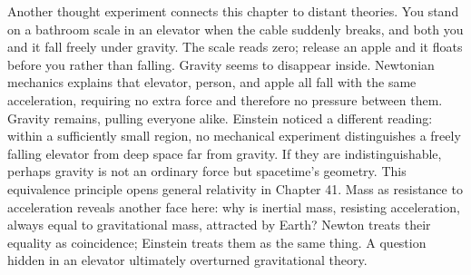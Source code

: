 \begin{thought}
Another thought experiment connects this chapter to distant theories. You stand on a bathroom scale in an elevator when the cable suddenly breaks, and both you and it fall freely under gravity. The scale reads zero; release an apple and it floats before you rather than falling. Gravity seems to disappear inside. Newtonian mechanics explains that elevator, person, and apple all fall with the same acceleration, requiring no extra force and therefore no pressure between them. Gravity remains, pulling everyone alike. Einstein noticed a different reading: within a sufficiently small region, no mechanical experiment distinguishes a freely falling elevator from deep space far from gravity. If they are indistinguishable, perhaps gravity is not an ordinary force but spacetime's geometry. This equivalence principle opens general relativity in Chapter 41. Mass as resistance to acceleration reveals another face here: why is inertial mass, resisting acceleration, always equal to gravitational mass, attracted by Earth? Newton treats their equality as coincidence; Einstein treats them as the same thing. A question hidden in an elevator ultimately overturned gravitational theory.
\end{thought}

